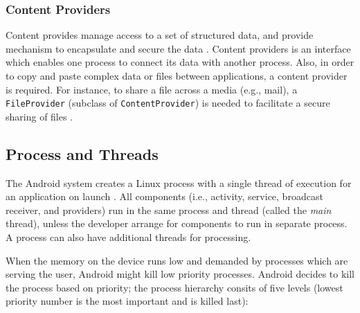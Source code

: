 \subsubsection{Content Providers}
Content provides manage access to a set of structured data, and provide mechanism to encapsulate and secure the data \cite{contentproviders}. Content providers is an interface which enables one process to connect its data with another process. Also, in order to copy and paste complex data or files between applications, a content provider is required. For instance, to share a file across a media (e.g., mail), a \verb|FileProvider| (subclass of \verb|ContentProvider|) is needed to facilitate a secure sharing of files \cite{fileprovider}.


\subsection{Process and Threads}
The Android system creates a Linux process with a single thread of execution for an application on launch \cite{proccessandthread}. All components (i.e., activity, service, broadcast receiver, and providers) run in the same process and thread (called the \textit{main} thread), unless the developer arrange for components to run in separate process. A process can also have additional threads for processing. 

When the memory on the device runs low and demanded by processes which are serving the user, Android might kill low priority processes. Android decides to kill the process based on priority; the process hierarchy consits of five levels (lowest priority number is the most important and is killed last):  

